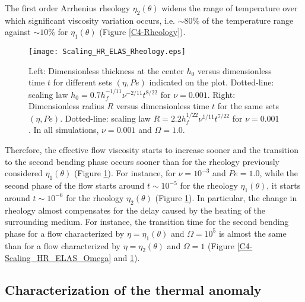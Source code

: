 The first  order Arrhenius rheology $\eta_2(\theta)$  widens the range
of temperature over which significant viscosity variation occurs, i.e.
$\sim80\%$   of  the   temperature   range   against  $\sim10\%$   for
$\eta_1(\theta)$ (Figure \ref{C4-Rheology}).

\begin{figure}[htpb]
  \begin{center}
    \graphicspath{ {/Users/thorey/Documents/These/Projet/Refroidissement/Skin_Model/Figure/Figure_Heating/} }
    \texttt{[image: Scaling\_HR\_ELAS\_Rheology.eps]}
    \caption{Left: Dimensionless thickness at  the center $h_0$ versus
      dimensionless time $t$ for  different sets $(\eta,Pe)$ indicated
      on      the      plot.        Dotted-line:      scaling      law
      $h_0=  0.7h_f^{-1/11}\nu^{-2/11}t^{8/22}$  for  $\nu  =  0.001$.
      Right: Dimensionless  radius $R$  versus dimensionless  time $t$
      for  the  same  sets   $(\eta,Pe)$.   Dotted-line:  scaling  law
      $R=  2.2h_f^{1/22}\nu^{1/11}t^{7/22}$ for  $\nu=0.001$.  In  all
      simulations, $\nu=0.001$ and $\Omega=1.0$.}
    \label{C4-Scaling_HR_ELAS_Rheology}
  \end{center}
\end{figure}

Therefore, the effective flow viscosity  starts to increase sooner and
the transition to the second bending  phase occurs sooner than for the
rheology     previously     considered    $\eta_1(\theta)$     (Figure
\ref{C4-Scaling_HR_ELAS_Rheology}).   For instance,  for $\nu=10^{-3}$
and  $Pe=1.0$,  while the  second  phase  of  the flow  starts  around
$t\sim 10^{-5}$  for the  rheology $\eta_1(\theta)$, it  starts around
$t\sim   10^{-6}$   for    the   rheology   $\eta_2(\theta)$   (Figure
\ref{C4-Scaling_HR_ELAS_Rheology}).   In  particular,  the  change  in
rheology almost compensates for the delay caused by the heating of the
surrounding medium. For  instance, the transition time  for the second
bending phase  for a  flow characterized by  $\eta=\eta_1(\theta)$ and
$\Omega=10^5$  is almost  the same  than for  a flow  characterized by
$\eta=\eta_2(\theta)$          and         $\Omega=1$          (Figure
\ref{C4-Scaling_HR_ELAS_Omega} and \ref{C4-Scaling_HR_ELAS_Rheology}).

\subsection{Characterization of the thermal anomaly}
\label{C4-sec:char-therm-anom}


